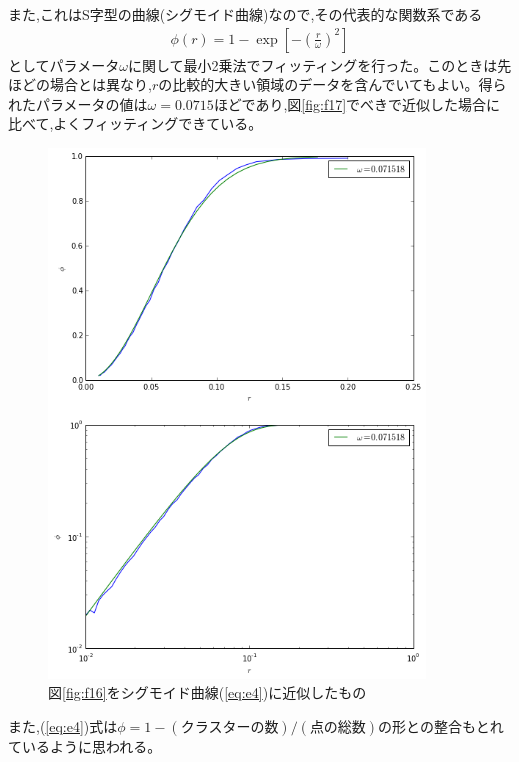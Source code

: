 また,これはS字型の曲線(シグモイド曲線)なので,その代表的な関数系である
\begin{eqnarray}\phi (r) = 1 - \exp \left[ -  \left( \frac{r}{\omega} \right)^{2} \right]\label{eq:e4}
\end{eqnarray}
としてパラメータ$\omega$に関して最小2乗法でフィッティングを行った。このときは先ほどの場合とは異なり,$r$の比較的大きい領域のデータを含んでいてもよい。得られたパラメータの値は$\omega=0.0715$ほどであり,図\ref{fig:f17}でべきで近似した場合に比べて,よくフィッティングできている。
\begin{figure}[H]
    \begin{center}
        \includegraphics[width=10cm]{../img/r_phi_1_sigmoid.png}
        \caption{図\ref{fig:f16}をシグモイド曲線(\ref{eq:e4})に近似したもの}
        \label{fig:f18}
    \end{center}
\end{figure}
また,(\ref{eq:e4})式は$\phi = 1- (\text{クラスターの数})/(\text{点の総数})$の形との整合もとれているように思われる。






